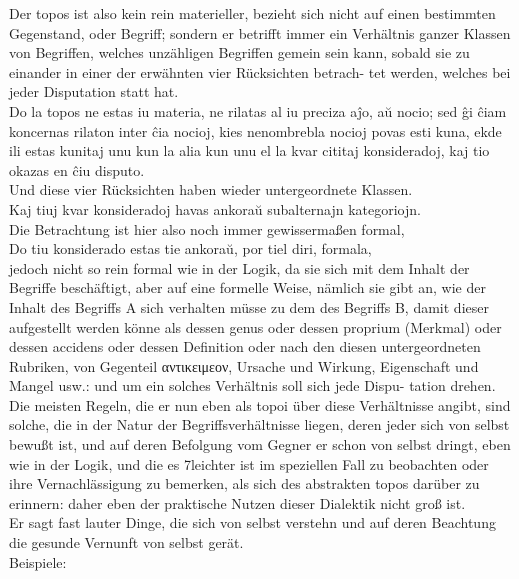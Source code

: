 \documentclass{book}
\newcommand{\de}[1]{{\color{red}#1}\\}
\newcommand{\eo}[1]{#1\\}
\newcommand{\eble}[1]{{\color{blue}#1}}
\begin{document}
\de{Der topos ist also kein rein materieller, bezieht
sich nicht auf einen bestimmten Gegenstand, oder
Begriff; sondern er betrifft immer ein Verhältnis
ganzer Klassen von Begriffen, welches unzähligen
Begriffen gemein sein kann, sobald sie zu einander
in einer der erwähnten vier Rücksichten betrach-
tet werden, welches bei jeder Disputation statt
hat.}
\eo{Do la topos ne estas iu materia, ne rilatas al \eble{iu} preciza aĵo,
aŭ nocio; sed ĝi ĉiam koncernas rilaton inter ĉia nocioj, kies
nenombrebla nocioj povas esti kuna, ekde ili estas kunitaj \eble{unu kun
la alia} kun unu el la kvar cititaj \eble{konsideradoj}, kaj tio okazas
en ĉiu disputo.} 
\de{Und diese vier Rücksichten haben wieder
untergeordnete Klassen.}
\eo{Kaj tiuj kvar \eble{konsideradoj} havas ankoraŭ subalternajn
kategoriojn.}
\de{Die Betrachtung ist hier
  also noch immer gewissermaßen formal,}
\eo{Do tiu konsiderado estas tie ankoraŭ, por tiel diri, formala,}
\de{jedoch
  nicht so rein formal wie in der Logik, da sie sich
mit dem Inhalt der Begriffe beschäftigt, aber auf
eine formelle Weise, nämlich sie gibt an, wie der
Inhalt des Begriffs A sich verhalten müsse zu dem
des Begriffs B, damit dieser aufgestellt werden
könne als dessen genus oder dessen proprium
(Merkmal) oder dessen accidens oder dessen
Definition oder nach den diesen untergeordneten
Rubriken, von Gegenteil \textgreek{αντικειμεον}, Ursache
und Wirkung, Eigenschaft und Mangel usw.: und
um ein solches Verhältnis soll sich jede Dispu-
tation drehen.}
\de{Die meisten Regeln, die er nun
eben als topoi über diese Verhältnisse angibt, sind
solche, die in der Natur der Begriffsverhältnisse
liegen, deren jeder sich von selbst bewußt ist, und
auf deren Befolgung vom Gegner er schon von
selbst dringt, eben wie in der Logik, und die es
7leichter ist im speziellen Fall zu beobachten oder
ihre Vernachlässigung zu bemerken, als sich des
abstrakten topos darüber zu erinnern: daher eben
der praktische Nutzen dieser Dialektik nicht groß
ist.}
\de{Er sagt fast lauter Dinge, die sich von selbst
verstehn und auf deren Beachtung die gesunde
Vernunft von selbst gerät.}
\de{Beispiele:}
\end{document}
